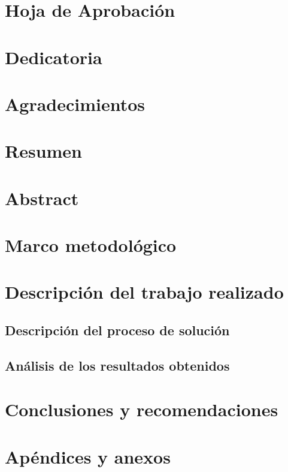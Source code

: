 \documentclass[11pt, sfdefaults=false, spanish]{scrreprt}
\begin{document}


\chapter*{Hoja de Aprobación}
\chapter*{Dedicatoria}
\chapter*{Agradecimientos}

\chapter*{Resumen}
\chapter*{Abstract}

\tableofcontents
\listoftables
\listoffigures







\chapter{Marco metodológico}

\chapter{Descripción del trabajo realizado}

\section{Descripción del proceso de solución}
\section{Análisis de los resultados obtenidos}

\chapter{Conclusiones y recomendaciones}

\printbibliography

\clearpage

\chapter{Apéndices y anexos}
\end{document}

